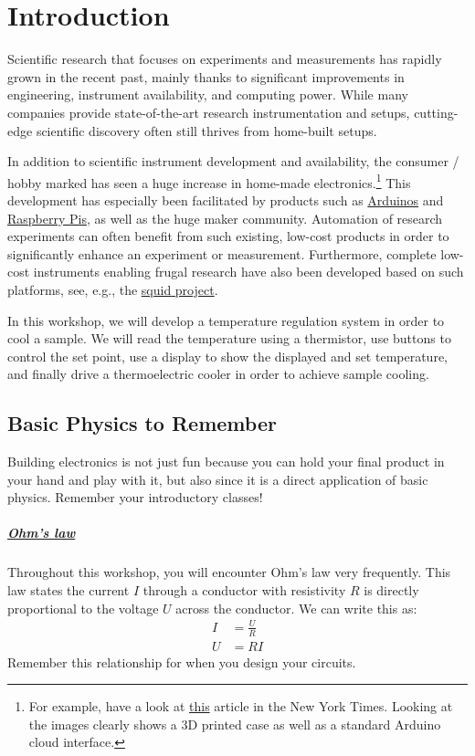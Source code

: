 
\chapter{Introduction}

Scientific research that focuses on experiments and measurements has rapidly grown in the recent past, mainly thanks to significant improvements in engineering, instrument availability, and computing power. While many companies provide state-of-the-art research instrumentation and setups, cutting-edge scientific discovery often still thrives from home-built setups. 

In addition to scientific instrument development and availability, the consumer / hobby marked has seen a huge increase in home-made electronics.\footnote{For example, have a look at \href{https://www.nytimes.com/2021/10/10/health/coronavirus-ventilation-carbon-dioxide.html}{this} article in the New York Times. Looking at the images clearly shows a 3D printed case as well as a standard Arduino cloud interface.} This development has especially been facilitated by products such as \href{https://www.arduino.cc/}{Arduinos} and \href{https://www.raspberrypi.org/}{Raspberry Pis}, as well as the huge maker community. Automation of research experiments can often benefit from such existing, low-cost products in order to significantly enhance an experiment or measurement. Furthermore, complete low-cost instruments enabling frugal research have also been developed based on such platforms, see, e.g., the \href{https://squid-imaging.org/}{\ac{squid} project}.

In this workshop, we will develop a temperature regulation system in order to cool a sample. We will read the temperature using a thermistor, use buttons to control the set point, use a display to show the displayed and set temperature, and finally drive a thermoelectric cooler in order to achieve sample cooling.

\section{Basic Physics to Remember}

Building electronics is not just fun because you can hold your final product in your hand and play with it, but also since it is a direct application of basic physics. Remember your introductory classes! 

\paragraph{\href{https://en.wikipedia.org/wiki/Ohm's_law}{Ohm's law}} Throughout this workshop, you will encounter Ohm's law very frequently. This law states the current $I$ through a conductor with resistivity $R$ is directly proportional to the voltage $U$ across the conductor. We can write this as:
\begin{align}
    I &= \frac{U}{R}\\
    U &= RI \label{eqn:uri}
\end{align}
Remember this relationship for when you design your circuits.

